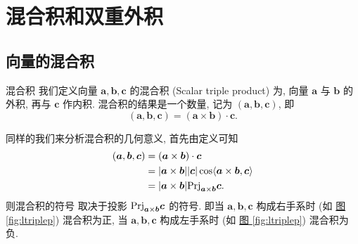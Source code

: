 \documentclass[cn,toc=twocol]{elegantbook}
\newcommand{\ve}[1]{\boldsymbol{#1}}
\newcommand{\vtimes}[2]{\ve{#1} \times \ve{#2}}
\begin{document}
\section{混合积和双重外积}

\subsection{向量的混合积}

\begin{definition}{混合积}
我们定义向量 $\ve a, \ve b, \ve c$ 的混合积 (Scalar triple product) 为, 向量 $\ve a$ 与 $\ve b$ 的外积, 再与 $\ve c$ 作内积. 混合积的结果是一个数量, 记为 $(\ve a,\ve b, \ve c)$, 即
\[
	(\ve a,\ve b, \ve c) = (\vtimes{a}{b}) \cdot \ve c.
\]
\end{definition}

同样的我们来分析混合积的几何意义, 首先由定义可知
\[
\begin{aligned}
	(\ve a,\ve b,\ve c) &= (\vtimes{a}{b}) \cdot \ve c\\
	&= \lvert \vtimes{a}{b} \rvert \lvert \ve c \rvert \cos \langle \vtimes{a}{b},\ve c \rangle\\
	&= \lvert \vtimes{a}{b} \rvert \rm{Prj}_{\vtimes{a}{b}} \ve c.
\end{aligned}
\]
则混合积的符号 取决于投影 $\rm{Prj}_{\vtimes{a}{b}} \ve c$ 的符号. 即当 $\ve a, \ve b, \ve c$ 构成右手系时 (如 \hyperref[fig:ltriplep]{图 \ref*{fig:ltriplep}}) 混合积为正, 当 $\ve a, \ve b, \ve c$ 构成左手系时 (如 \hyperref[fig:rtriplep]{图 \ref*{fig:ltriplep}}) 混合积为负.
\end{document}
